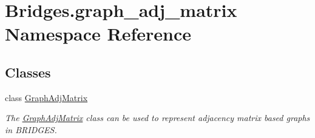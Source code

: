 \hypertarget{namespace_bridges_1_1graph__adj__matrix}{}\section{Bridges.\+graph\+\_\+adj\+\_\+matrix Namespace Reference}
\label{namespace_bridges_1_1graph__adj__matrix}
\subsection*{Classes}
\begin{DoxyCompactItemize}
\item 
class \hyperlink{class_bridges_1_1graph__adj__matrix_1_1_graph_adj_matrix}{Graph\+Adj\+Matrix}
\begin{DoxyCompactList}\small\item\em The \hyperlink{class_bridges_1_1graph__adj__matrix_1_1_graph_adj_matrix}{Graph\+Adj\+Matrix} class can be used to represent adjacency matrix based graphs in B\+R\+I\+D\+G\+E\+S. \end{DoxyCompactList}\end{DoxyCompactItemize}
